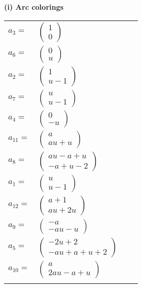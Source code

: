 \documentclass[1p]{elsarticle_modified}
\theoremstyle{definition}
\begin{document}
\flushleft \textbf{(i) Arc colorings}\\
\begin{tabular}{m{7pt} m{180pt} m{7pt} m{180pt} }
\flushright $a_{3}=$&$\begin{pmatrix}1\\0\end{pmatrix}$ \\
\flushright $a_{6}=$&$\begin{pmatrix}0\\u\end{pmatrix}$ \\
\flushright $a_{2}=$&$\begin{pmatrix}1\\u-1\end{pmatrix}$ \\
\flushright $a_{7}=$&$\begin{pmatrix}u\\u-1\end{pmatrix}$ \\
\flushright $a_{4}=$&$\begin{pmatrix}0\\- u\end{pmatrix}$ \\
\flushright $a_{11}=$&$\begin{pmatrix}a\\a u+u\end{pmatrix}$ \\
\flushright $a_{8}=$&$\begin{pmatrix}a u- a+u\\- a+u-2\end{pmatrix}$ \\
\flushright $a_{1}=$&$\begin{pmatrix}u\\u-1\end{pmatrix}$ \\
\flushright $a_{12}=$&$\begin{pmatrix}a+1\\a u+2 u\end{pmatrix}$ \\
\flushright $a_{9}=$&$\begin{pmatrix}- a\\- a u- u\end{pmatrix}$ \\
\flushright $a_{5}=$&$\begin{pmatrix}-2 u+2\\- a u+a+u+2\end{pmatrix}$ \\
\flushright $a_{10}=$&$\begin{pmatrix}a\\2 a u- a+u\end{pmatrix}$\\&\end{tabular}
\end{document}
